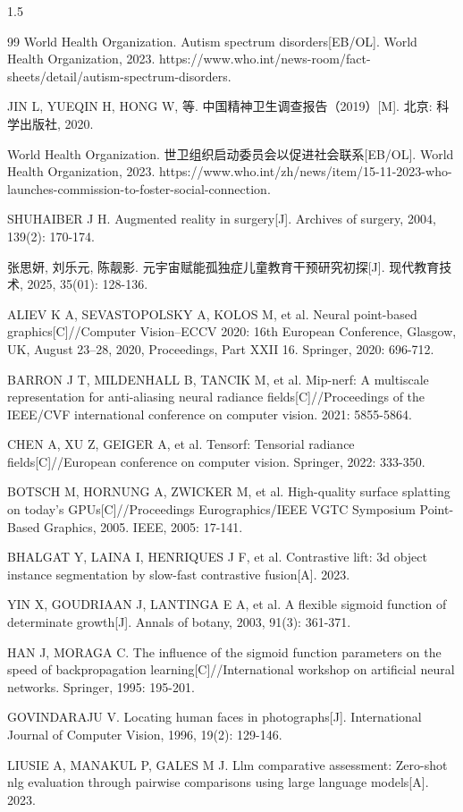 \documentclass[zihao=-4]{ctexart}
\begin{document}
\begin{spacing}{1.5}
\begin{thebibliography}{99}
 World Health Organization. Autism spectrum disorders[EB/OL]. World Health Organization, 2023. https://www.who.int/news-room/fact-sheets/detail/autism-spectrum-disorders.

 JIN L, YUEQIN H, HONG W, 等. 中国精神卫生调查报告（2019）[M]. 北京: 科学出版社, 2020.

 World Health Organization. 世卫组织启动委员会以促进社会联系[EB/OL]. World Health Organization, 2023. https://www.who.int/zh/news/item/15-11-2023-who-launches-commission-to-foster-social-connection.

 SHUHAIBER J H. Augmented reality in surgery[J]. Archives of surgery, 2004, 139(2): 170-174.

 张思妍, 刘乐元, 陈靓影. 元宇宙赋能孤独症儿童教育干预研究初探[J]. 现代教育技术, 2025, 35(01): 128-136.

 ALIEV K A, SEVASTOPOLSKY A, KOLOS M, et al. Neural point-based graphics[C]//Computer Vision--ECCV 2020: 16th European Conference, Glasgow, UK, August 23--28, 2020, Proceedings, Part XXII 16. Springer, 2020: 696-712.

 BARRON J T, MILDENHALL B, TANCIK M, et al. Mip-nerf: A multiscale representation for anti-aliasing neural radiance fields[C]//Proceedings of the IEEE/CVF international conference on computer vision. 2021: 5855-5864.

 CHEN A, XU Z, GEIGER A, et al. Tensorf: Tensorial radiance fields[C]//European conference on computer vision. Springer, 2022: 333-350.

 BOTSCH M, HORNUNG A, ZWICKER M, et al. High-quality surface splatting on today’s GPUs[C]//Proceedings Eurographics/IEEE VGTC Symposium Point-Based Graphics, 2005. IEEE, 2005: 17-141.

 BHALGAT Y, LAINA I, HENRIQUES J F, et al. Contrastive lift: 3d object instance segmentation by slow-fast contrastive fusion[A]. 2023.

 YIN X, GOUDRIAAN J, LANTINGA E A, et al. A flexible sigmoid function of determinate growth[J]. Annals of botany, 2003, 91(3): 361-371.

 HAN J, MORAGA C. The influence of the sigmoid function parameters on the speed of backpropagation learning[C]//International workshop on artificial neural networks. Springer, 1995: 195-201.

 GOVINDARAJU V. Locating human faces in photographs[J]. International Journal of Computer Vision, 1996, 19(2): 129-146.

 LIUSIE A, MANAKUL P, GALES M J. Llm comparative assessment: Zero-shot nlg evaluation through pairwise comparisons using large language models[A]. 2023.

\end{thebibliography}
\end{spacing}
\end{document}
